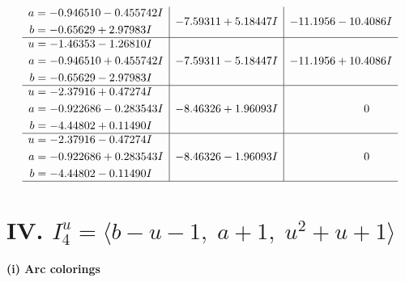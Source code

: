 \documentclass[1p]{elsarticle_modified}
\theoremstyle{definition}
\begin{document}
$$\begin{array}{c|c|c}
\begin{aligned}
a &= -0.946510 - 0.455742 I \\
b &= -0.65629 + 2.97983 I\end{aligned}
 & -7.59311 + 5.18447 I & -11.1956 - 10.4086 I \\ \hline\begin{aligned}
u &= -1.46353 - 1.26810 I \\
a &= -0.946510 + 0.455742 I \\
b &= -0.65629 - 2.97983 I\end{aligned}
 & -7.59311 - 5.18447 I & -11.1956 + 10.4086 I \\ \hline\begin{aligned}
u &= -2.37916 + 0.47274 I \\
a &= -0.922686 - 0.283543 I \\
b &= -4.44802 + 0.11490 I\end{aligned}
 & -8.46326 + 1.96093 I & \phantom{-0.000000 } 0 \\ \hline\begin{aligned}
u &= -2.37916 - 0.47274 I \\
a &= -0.922686 + 0.283543 I \\
b &= -4.44802 - 0.11490 I\end{aligned}
 & -8.46326 - 1.96093 I & \phantom{-0.000000 } 0\\
 \hline 
 \end{array}$$\newpage\newpage\renewcommand{\arraystretch}{1}
\centering \section*{IV. $I^u_{4}= \langle b- u-1,\;a+1,\;u^2+u+1 \rangle$}
\flushleft \textbf{(i) Arc colorings}\\
\end{document}
